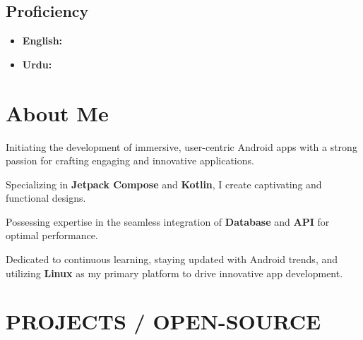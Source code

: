 \documentclass[bold]{deedy-resume-openfont}
\begin{document}
\begin{minipage}[t]{0.33\textwidth}
\subsection{Proficiency}
\begin{itemize}[label=\textbullet, leftmargin=*, topsep=5pt, itemsep=-1ex]
    \item \textbf{English:} 
    \item \textbf{Urdu:} 
\end{itemize}
\sectionsep


%
%

\end{minipage} 
\hfill
\begin{minipage}[t]{0.66\textwidth} 


\section{About Me}
\vspace{\topsep} %
\begin{tightemize}
    \item Initiating the development of immersive, user-centric Android apps with a strong passion for crafting engaging and innovative applications.
    \item Specializing in \textbf{Jetpack Compose} and \textbf{Kotlin}, I create captivating and functional designs.
    \item Possessing expertise in the seamless integration of \textbf{Database} and \textbf{API} for optimal performance.
    \item Dedicated to continuous learning, staying updated with Android trends, and utilizing \textbf{Linux} as my primary platform to drive innovative app development.
\end{tightemize}
\sectionsep




\section*{PROJECTS / OPEN-SOURCE}


\end{minipage}
\end{document}
